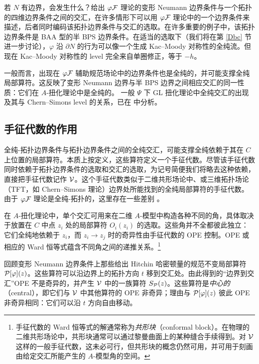 若 $N$ 有边界，会发生什么？给出 $\varphi{\mathcal F}$ 理论的变形 Neumann 边界条件与一个拓扑的四维边界条件之间的交汇，在许多情形下可以用 $\varphi{\mathcal F}$ 理论中的一个边界条件来描述，后者同时编码该拓扑边界条件与交汇的选取。在许多重要的例子中，该拓扑边界条件是 BAA 型的半 BPS 边界条件。在适当的选取下（我们将在第 \ref{Dbc} 节进一步讨论），$\varphi$ 沿 $\partial N$ 的行为可以像一个生成 Kac–Moody 对称性的全纯流。但现在 Kac–Moody 对称性的 level 完全来自单圈修正，等于 $-h$。

一般而言，出现在 $\varphi{\mathcal F}$ 辅助规范场论中的边界条件也是全纯的，并可能支撑全纯局部算符。这反映了变形 Neumann 边界与半 BPS 边界之间相应交汇的同一性质：它们在 $A$-扭化理论中是全纯的。 一般 $\Psi$ 下 GL 扭化理论中全纯交汇的出现及其与 Chern–Simons level 的关系，已在 \cite{Gaiotto:2017euk} 中分析。

\subsection{手征代数的作用} \label{RoleChiral}
全纯-拓扑边界条件与拓扑边界条件之间的全纯交汇，可能支撑全纯依赖于其在 $C$ 上位置的局部算符。本质上按定义，这些算符定义一个手征代数。尽管该手征代数同时依赖于拓扑边界条件的选取和交汇的选取，为记号简便我们将略去这种依赖，直接把手征代数记作 ${\cal V}$。这个手征代数类似于二维共形场论中、或三维拓扑场论（TFT，如 Chern–Simons 理论）边界处所能找到的全纯局部算符的手征代数。由于 $\varphi {\mathcal F}$ 理论是全纯-拓扑的，这里存在一些差别 \cite{Costello:2020ndc}。

在 $A$-扭化理论中，单个交汇可用来在二维 $A$-模型中构造各种不同的角，具体取决于放置在 $C$ 中点 $z_i$ 处的局部算符 $O_i(z_i)$ 的选取。这些角并不全都彼此独立：它们全纯地依赖于 $z_i$，而 $z_i \to z_j$ 时的奇异性由手征代数的 OPE 控制。OPE 或相应的 Ward 恒等式蕴含不同角之间的递推关系。\footnote{手征代数的 Ward 恒等式的解通常称为{\it 共形块}（conformal block）。在物理的二维共形场论中，共形块通常可以通过黎曼曲面上的某种缝合手续得到。对 ${\cal V}$ 这样的一般手征代数，这未必可行，但共形块的概念仍然可用，并可用于刻画由给定交汇所能产生的 $A$-模型角的空间。}

回顾变形 Neumann 边界条件上那些给出 Hitchin 哈密顿量的规范不变局部算符 ${\cal P}[\varphi](z)$。这些算符可以沿边界上的拓扑方向 $t$ 移到交汇处。由此得到的“边界到交汇”OPE 不是奇异的，并产生 ${\cal V}$ 中的一族算符 $S_{\cal P}(z)$。这些算符是{\it 中心的}（central），即它们与 ${\cal V}$ 中其他算符的 OPE 非奇异；理由与 ${\cal P}[\varphi](z)$ 彼此 OPE 非奇异相同：它们可以沿 $t$ 方向自由移动。

